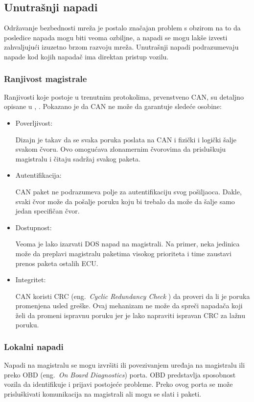 \documentclass[a4paper]{article}
\begin{document}
\subsection{Unutrašnji napadi}
\label{subsec:napadiunutar}

Održavanje bezbednosti mreža je postalo značajan problem s obzirom na to da posledice napada mogu biti veoma ozbiljne, a napadi se mogu lakše izvesti zahvaljujući izuzetno brzom razvoju mreža. Unutrašnji napadi podrazumevaju napade kod kojih napadač ima direktan pristup vozilu. 

\subsubsection{Ranjivost magistrale}
  Ranjivosti koje postoje u trenutnim protokolima, prvenstveno CAN, su detaljno opisane u \cite{security1}, \cite{security2}. Pokazano je da CAN ne može da garantuje sledeće osobine:
  \begin{itemize}
  	\item Poverljivost: 
    
    Dizajn je takav da se svaka poruka poslata na CAN i fizički i logički šalje svakom čvoru. Ovo omogućava zlonamernim čvorovima da prisluškuju magistralu i čitaju sadržaj svakog paketa.
    \item Autentifikacija:
    
    CAN paket ne podrazumeva polje za autentifikaciju svog pošiljaoca. Dakle, svaki čvor može da pošalje poruku koju bi trebalo da može da šalje samo jedan specifičan čvor.
    
    \item Dostupnost:
    
    Veoma je lako izazvati DOS napad na magistrali. Na primer, neka jedinica može da preplavi magistralu paketima visokog prioriteta i time zaustavi prenos paketa ostalih ECU.
    \item Integritet:
    
    CAN koristi CRC (eng.~{\em Cyclic Redundancy Check} \cite{CRC}) da proveri da li je poruka promenjena usled greške. Ovaj mehanizam ne može da spreči napadača koji želi da promeni ispravnu poruku jer je lako napraviti ispravan CRC za lažnu poruku.     
  \end{itemize}

\subsubsection{Lokalni napadi}
\label{subsubsec: loknap}  
  Napadi na magistralu se mogu izvršiti ili povezivanjem uređaja na magistralu ili preko OBD (eng.~{\em On Board Diagnostics}) porta. OBD predstavlja sposobnost vozila da identifikuje i prijavi postojeće probleme. Preko ovog porta se može prisluškivati komunikacija na magistrali ali mogu se slati i paketi.
\end{document}
